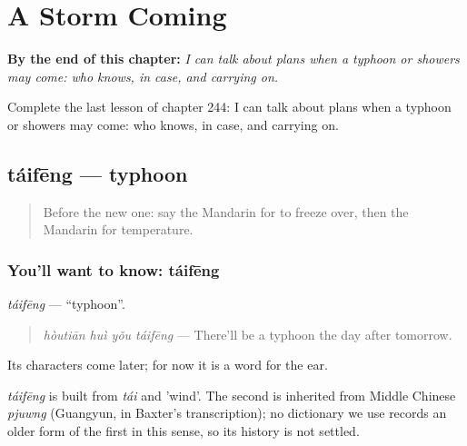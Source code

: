 
\chapter{A Storm Coming}
\label{ch:zh-a-storm-coming}

\begin{chapteropening}
\textbf{By the end of this chapter:} \emph{I can talk about plans when a typhoon or showers may come: who knows, in case, and carrying on.}

Complete the last lesson of chapter 244: I can talk about plans when a typhoon or showers may come: who knows, in case, and carrying on.
\end{chapteropening}

\section[táifēng]{táifēng — typhoon}

\label{lesson:ZH-C244-taifeng}



\begin{quote}
Before the new one: say the Mandarin for to freeze over, then the Mandarin for temperature.
\end{quote}

\subsection*{You'll want to know: táifēng}
\emph{táifēng} — \textquotedblleft{}typhoon\textquotedblright{}.

\begin{quote}
\emph{hòutiān huì yǒu táifēng} — There'll be a typhoon the day after tomorrow.
\end{quote}

Its characters come later; for now it is a word for the ear.

\begin{cousinweb}
\emph{táifēng} is built from \emph{tái} and  'wind'. The second is inherited from Middle Chinese \emph{pjuwng} (Guangyun, in Baxter's transcription); no dictionary we use records an older form of the first in this sense, so its history is not settled.
\end{cousinweb}

